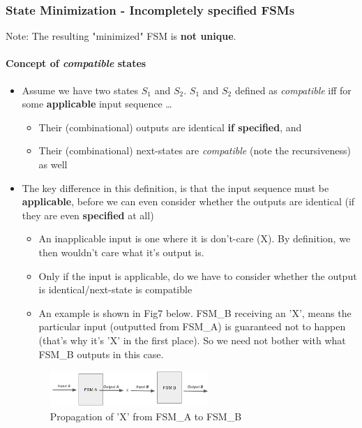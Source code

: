 \documentclass{article}
\begin{document}
\newpage
\subsubsection{State Minimization - Incompletely specified FSMs}
Note: The resulting "minimized" FSM is \textbf{not unique}.

\paragraph{Concept of \textit{compatible} states}
\begin{itemize}
    \item Assume we have two states $S_{1}$ and $S_{2}$. $S_{1}$ and $S_{2}$ defined as \textit{compatible} iff for some \textbf{applicable} input sequence \dots
        \begin{itemize}
            \item Their (combinational) outputs are identical \textbf{if specified}, and
            \item Their (combinational) next-states are \textit{compatible} (note the recursiveness) as well
        \end{itemize}
    \item The key difference in this definition, is that the input sequence must be \textbf{applicable}, before we can even consider whether the outputs are identical (if they are even \textbf{specified} at all)
        \begin{itemize}
            \item An inapplicable input is one where it is don't-care (X). By definition, we then wouldn't care what it's output is.
            \item Only if the input is applicable, do we have to consider whether the output is identical/next-state is compatible 
            \item An example is shown in Fig7 below. FSM\_B receiving an 'X', means the particular input (outputted from FSM\_A) is guaranteed not to happen (that's why it's 'X' in the first place). So we need not bother with what FSM\_B outputs in this case.
        \end{itemize}
        \begin{figure}[htp]
            \centering
            \includegraphics[width=6cm, scale=1]{S2/dontCareOutputInput.PNG}
            \caption{Propagation of 'X' from FSM\_A to FSM\_B}

\end{figure}
\end{itemize}
\end{document}
